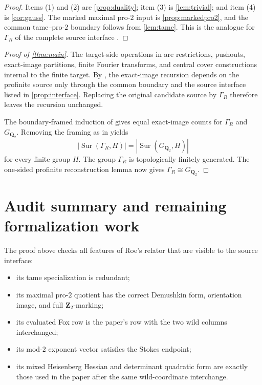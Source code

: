 \documentclass[11pt]{article}
\numberwithin{equation}{section}
\theoremstyle{definition}
\theoremstyle{remark}
\newcommand{\Q}{\mathbf Q}
\newcommand{\Z}{\mathbf Z}
\newcommand{\GQ}{G_{\Q_2}}
\newcommand{\Sur}{\operatorname{Sur}}
\newcommand{\GammaR}{\Gamma_R}
\begin{document}
\begin{proof}
Items (1) and (2) are \cref{prop:duality}; item (3) is
\cref{lem:trivial}; and item (4) is \cref{cor:gauss}.  The marked maximal
pro-\(2\) input is \cref{prop:markedpro2}, and the common tame--pro-\(2\)
boundary follows from \cref{lem:tame}.  This is the analogue for
\(\GammaR\) of the complete source interface
\cite[Corollary~6.19]{RT}.
\end{proof}

\begin{proof}[Proof of \cref{thm:main}]
The target-side operations in \cite[\S\S7--9]{RT} are restrictions,
pushouts, exact-image partitions, finite Fourier transforms, and central
cover constructions internal to the finite target.  By
\cite[Theorem~8.17]{RT}, the exact-image recursion depends on the profinite
source only through the common boundary and the source interface listed in
\cref{prop:interface}.  Replacing the original candidate source by
\(\GammaR\) therefore leaves the recursion unchanged.

The boundary-framed induction of \cite[Theorem~4.2 and \S9]{RT} gives equal
exact-image counts for \(\GammaR\) and \(\GQ\).  Removing the framing as in
\cite[\S10]{RT} yields
\[
  |\Sur(\GammaR,H)|=|\Sur(\GQ,H)|
\]
for every finite group \(H\).  The group \(\GammaR\) is topologically
finitely generated.  The one-sided profinite reconstruction lemma
\cite[Lemma~2.5]{RT} now gives \(\GammaR\cong\GQ\).
\end{proof}

\clearpage
\section{Audit summary and remaining formalization work}

The proof above checks all features of Roe's relator that are visible to
the source interface:
\begin{itemize}
  \item its tame specialization is redundant;
  \item its maximal pro-\(2\) quotient has the correct Demushkin form,
        orientation image, and full \(\Z_2\)-marking;
  \item its evaluated Fox row is the paper's row with the two wild columns
        interchanged;
  \item its mod-\(2\) exponent vector satisfies the Stokes endpoint;
  \item its mixed Heisenberg Hessian and determinant quadratic form are
        exactly those used in the paper after the same wild-coordinate
        interchange.
\end{itemize}
\end{document}
